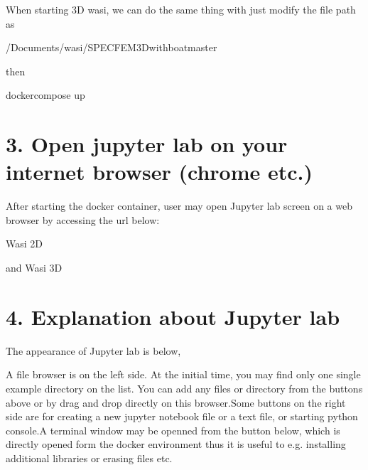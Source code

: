 \documentclass[letterpaper,10pt,english]{sphinxmanual}
\begin{document}
When starting 3D wasi, we can do the same thing with just modify the file path as

\begin{sphinxVerbatim}[commandchars=\\\{\}]
 \PYGZti{}/Documents/wasi/SPECFEM3D\PYGZus{}with\PYGZus{}boat\PYGZhy{}master
\end{sphinxVerbatim}

then

\begin{sphinxVerbatim}[commandchars=\\\{\}]
docker\PYGZhy{}compose up
\end{sphinxVerbatim}


\section{3. Open jupyter lab on your internet browser (chrome etc.)}
\label{\detokenize{tutorial:open-jupyter-lab-on-your-internet-browser-chrome-etc}}
After starting the docker container, user may open Jupyter lab screen on a web browser by accessing the url below:

Wasi 2D

\begin{sphinxVerbatim}[commandchars=\\\{\}]
\end{sphinxVerbatim}

and Wasi 3D

\begin{sphinxVerbatim}[commandchars=\\\{\}]
\end{sphinxVerbatim}


\section{4. Explanation about Jupyter lab}
\label{\detokenize{tutorial:explanation-about-jupyter-lab}}
The appearance of Jupyter lab is below,

A file browser is on the left side. At the initial time, you may find only one single example directory on the list. You can add any files or directory from the buttons above or by drag and drop directly on this browser.Some buttons on the right side are for creating a new jupyter notebook file or a text file, or starting python console.A terminal window may be openned from the button below, which is directly opened form the docker environment thus it is useful to e.g. installing additional libraries or erasing files etc.
\end{document}
